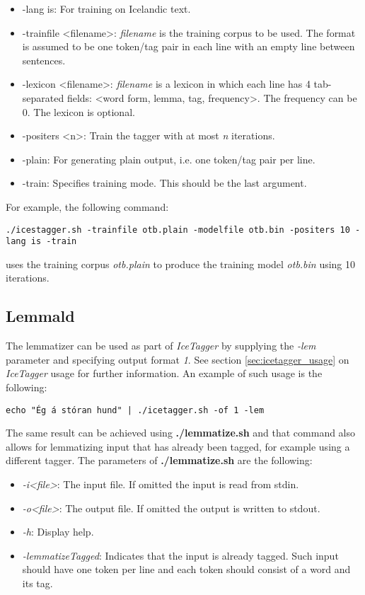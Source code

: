 \documentclass[11pt]{article}
\begin{document}
\begin{itemize}
\item -lang is: For training on Icelandic text.
\item -trainfile <filename>: \emph{filename} is the training corpus to be used.  The format is assumed to be one token/tag pair in each line with an empty line between sentences.
\item -lexicon <filename>: \emph{filename} is a lexicon in which  each line has 4 tab-separated fields: <word form, lemma, tag, frequency>.  The frequency can be 0.  The lexicon is optional.
\item -positers <n>:  Train the tagger with at most \emph{n} iterations.
\item -plain: For generating plain output, i.e. one token/tag pair per line.
\item -train: Specifies training mode.  This should be the last argument.
\end{itemize}

For example, the following command:

\begin{verbatim}
./icestagger.sh -trainfile otb.plain -modelfile otb.bin -positers 10 -lang is -train
\end{verbatim}

uses the training corpus \emph{otb.plain} to produce the training model \emph{otb.bin} using 10 iterations. 


\subsection{Lemmald}
The lemmatizer can be used as part of \textit{IceTagger} by supplying the \textit{-lem} parameter and specifying output
format \textit{1}. See section \ref{sec:icetagger_usage} on \textit{IceTagger} usage for further information. 
An example of such usage is the following:

\begin{verbatim}
echo "Ég á stóran hund" | ./icetagger.sh -of 1 -lem 
\end{verbatim}

The same result can be achieved using \textbf{./lemmatize.sh} and that command also allows for lemmatizing
input that has already been tagged, for example using a different tagger. The parameters of \textbf{./lemmatize.sh}
are the following:
\begin{itemize}
 \item \textit{-i<file>}: The input file. If omitted the input is read from stdin.
 \item \textit{-o<file>}: The output file. If omitted the output is written to stdout.
 \item \textit{-h}: Display help.
 \item \textit{-lemmatizeTagged}: Indicates that the input is already tagged. Such input
      should have one token per line and each token should consist of a word and its tag.
\end{itemize}
\end{document}
